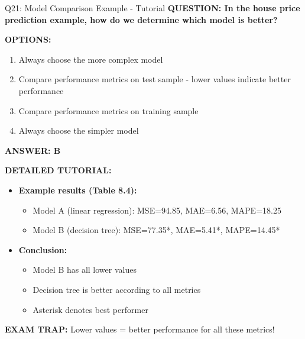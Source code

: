 \documentclass[8pt]{beamer}
\begin{document}
	\begin{frame}{Q21: Model Comparison Example - Tutorial}
		\fontsize{6.5}{7.5}\selectfont
		\textbf{QUESTION: In the house price prediction example, how do we determine which model is better?}
		
		\vspace{0.1cm}
		\textbf{OPTIONS:}
		\begin{enumerate}
			\item Always choose the more complex model
			\item Compare performance metrics on test sample - lower values indicate better performance
			\item Compare performance metrics on training sample
			\item Always choose the simpler model
		\end{enumerate}
		
		\vspace{0.1cm}
		\textcolor{myblue}{\textbf{ANSWER: B}}
		
		\vspace{0.1cm}
		\textbf{DETAILED TUTORIAL:}
		\begin{itemize}
			\item \textbf{Example results (Table 8.4):}
			\begin{itemize}
				\item Model A (linear regression): MSE=94.85, MAE=6.56, MAPE=18.25
				\item Model B (decision tree): MSE=77.35*, MAE=5.41*, MAPE=14.45*
			\end{itemize}
			\item \textbf{Conclusion:}
			\begin{itemize}
				\item Model B has all lower values
				\item Decision tree is better according to all metrics
				\item Asterisk denotes best performer
			\end{itemize}
		\end{itemize}
		
		\textcolor{myred}{\textbf{EXAM TRAP:}} Lower values = \textcolor{myblue}{better performance} for all these metrics!
	\end{frame}
	
\end{document}
